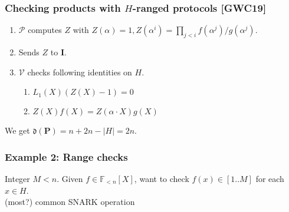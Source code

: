 \documentclass[shadesubsections,compress,14pt,mathserif]{beamer}
\newcommand{\prot}{\mathbf{P}}
\newcommand{\aggdeg}[1]{\mathfrak{d}(#1)}
\newcommand{\F}{\ensuremath{\mathbb F}}
\newcommand{\ver}{\ensuremath{\mathcal{V}}}
\newcommand{\prv}{\ensuremath{\mathcal{P}}}
\newcommand{\polysofdeg}[1]{\F_{< #1}[X]}
\newcommand{\ideal}{\mathbf{I}}
\newcommand{\gen}{\alpha}
\begin{document}
\begin{frame}
\frametitle{Checking products with $H$-ranged protocols \small{[GWC19]}}   %
 \begin{enumerate}
  \item $\prv$ computes $Z$ with 
  $ Z(\gen)=1, Z(\gen^i) = \prod_{j<i}  f(\gen^j)/g(\gen^j)$.
  \item Sends $Z$ to $\ideal$.   \pause
  \item $\ver$ checks following identities on $H$.
  \begin{enumerate}
   \item $L_1(X) (Z(X)-1) =0$
   \item $Z(X) f(X) = Z(\gen\cdot X)g(X)$\pause
 \end{enumerate}

 \end{enumerate}
 \vspace{0.2in}
We get $\aggdeg{\prot}=n+2n -|H| = 2n$.


\end{frame}
\begin{frame}
\frametitle{Example 2: Range checks}

Integer $M<n$. Given $f\in \polysofdeg{n}$, want to check $f(x)\in [1..M]$ for each $x\in H$.\\ \pause
(most?) common SNARK operation \\ 

\end{frame}
\end{document}

